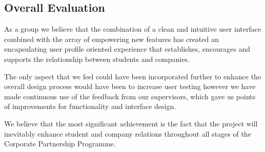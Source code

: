 \subsection{Overall Evaluation}
  As a group we believe that the combination of a clean and intuitive user interface combined with the array of empowering new features has created an encapsulating user profile oriented experience that establishes, encourages and supports the relationship between students and companies.

  The only aspect that we feel could have been incorporated further to enhance the overall design process would have been to increase user testing however we have made continuous use of the feedback from our supervisors, which gave us points of improvements for functionality and interface design.
  
  We believe that the most significant achievement is the fact that the project will inevitably enhance student and company relations throughout all stages of the Corporate Partnership Programme.
